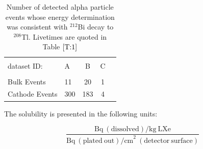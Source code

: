 \begin{table}[ht]
\centering
\caption{Number of detected alpha particle events whose energy determination was consistent with $^{212}$Bi decay to $^{208}$Tl. Livetimes are quoted in Table $\ref{T:1}$}
\begin{tabular}{llccc}
\hline
\\[-2pt]
dataset ID: & A &B & C \\
\\[-2pt]
\hline
Bulk Events & 11 & 20 & 1 \\
Cathode Events & 300 & 183 & 4 \\
\hline
\end{tabular}
\label{T:3}
\end{table}



The solubility is presented in the following units:


\begin{equation}
\frac{   \mathrm{Bq~(dissolved)/ kg~LXe} }{ \mathrm{Bq~(plated~out) / cm}^{2}~\mathrm{(detector~surface)} }
\end{equation}



